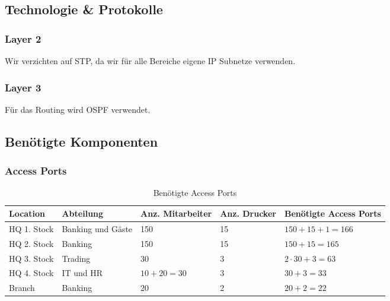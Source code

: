 \subsection{Technologie \& Protokolle}
\subsubsection{Layer 2}
Wir verzichten auf STP, da wir für alle Bereiche eigene IP Subnetze verwenden. 

\subsubsection{Layer 3}
Für das Routing wird OSPF verwendet. 

\subsection{Benötigte Komponenten}
\subsubsection{Access Ports}
\begin{table}[h]
	\centering
	\begin{tabu} to \linewidth {l l l l l}
		\toprule 
		Location & Abteilung & Anz. Mitarbeiter & Anz. Drucker & Benötigte Access Ports \\
		\midrule
		HQ 1. Stock & Banking und Gäste & 150 & 15 & $150 + 15 + 1 = 166$ \\ 
		HQ 2. Stock & Banking & 150 & 15 & $150 + 15 = 165$ \\
		HQ 3. Stock & Trading & 30 & 3 & $2 \cdot 30 + 3 = 63$ \\ 
		HQ 4. Stock & IT und HR & $10 + 20 = 30$ & 3 & $30 + 3 = 33$\\
		Branch  & Banking & 20 & 2 & $20 + 2 = 22$\\
		\bottomrule 
	\end{tabu} 
	\label{tbl:require_access_ports}
	\caption{Benötigte Access Ports}
\end{table}

